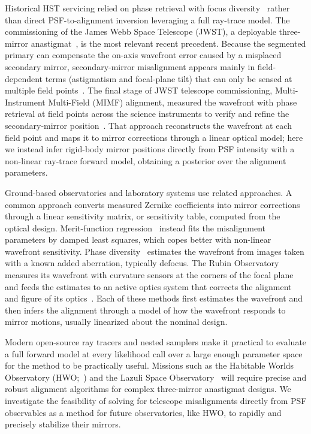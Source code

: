Historical HST servicing relied on phase retrieval with focus diversity~\citep{Fienup1982,Lofgren2014,Krist1997} rather than direct PSF-to-alignment inversion leveraging a full ray-trace model. The commissioning of the James Webb Space Telescope (JWST),  a deployable three-mirror anastigmat~\citep{Knight2012}, is the most relevant recent precedent. Because the segmented primary can compensate the on-axis wavefront error caused by a misplaced secondary mirror, secondary-mirror misalignment appears mainly in field-dependent terms (astigmatism and focal-plane tilt) that can only be sensed at multiple field points~\citep{ActonKnight2012}. The final stage of JWST telescope commissioning, Multi-Instrument Multi-Field (MIMF) alignment, measured the wavefront with phase retrieval at field points across the science instruments to verify and refine the secondary-mirror position~\citep{Acton2022,McElwain2023}. That approach reconstructs the wavefront at each field point and maps it to mirror corrections through a linear optical model; here we instead infer rigid-body mirror positions directly from PSF intensity with a non-linear ray-trace forward model, obtaining a posterior over the alignment parameters.

Ground-based observatories and laboratory systems use related approaches. A common approach converts measured Zernike coefficients into mirror corrections through a linear sensitivity matrix, or sensitivity table, computed from the optical design. Merit-function regression~\citep{Kim2007} instead fits the misalignment parameters by damped least squares, which copes better with non-linear wavefront sensitivity. Phase diversity~\citep{Gonsalves1982} estimates the wavefront from images taken with a known added aberration, typically defocus. The Rubin Observatory measures its wavefront with curvature sensors at the corners of the focal plane and feeds the estimates to an active optics system that corrects the alignment and figure of its optics~\citep{Xin2015}. Each of these methods first estimates the wavefront and then infers the alignment through a model of how the wavefront responds to mirror motions, usually linearized about the nominal design.

Modern open-source ray tracers and nested samplers make it practical to evaluate a full forward model at every likelihood call over a large enough parameter space for the method to be practically useful. Missions such as the Habitable Worlds Observatory (HWO;~\citealt{HWO2023}) and the Lazuli Space Observatory~\citep{Roy2026} will require precise and robust alignment algorithms for complex three-mirror anastigmat designs. We investigate the feasibility of solving for telescope misalignments directly from PSF observables as a method for future observatories, like HWO, to rapidly and precisely stabilize their mirrors.

